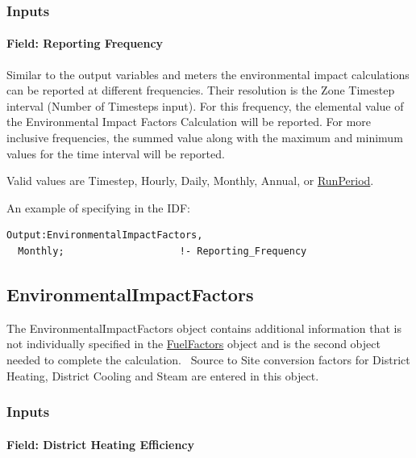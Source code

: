 \subsubsection{Inputs}\label{inputs-9-017}

\paragraph{Field: Reporting Frequency}\label{field-reporting-frequency-2}

Similar to the output variables and meters the environmental impact calculations can be reported at different frequencies. Their resolution is the Zone Timestep interval (Number of Timesteps input). For this frequency, the elemental value of the Environmental Impact Factors Calculation will be reported. For more inclusive frequencies, the summed value along with the maximum and minimum values for the time interval will be reported.

Valid values are Timestep, Hourly, Daily, Monthly, Annual, or \hyperref[runperiod]{RunPeriod}.

An example of specifying in the IDF:

\begin{lstlisting}
Output:EnvironmentalImpactFactors,
  Monthly;                    !- Reporting_Frequency
\end{lstlisting}

\subsection{EnvironmentalImpactFactors}\label{environmentalimpactfactors}

The EnvironmentalImpactFactors object contains additional information that is not individually specified in the \hyperref[fuelfactors]{FuelFactors} object and is the second object needed to complete the calculation.~ Source to Site conversion factors for District Heating, District Cooling and Steam are entered in this object.

\subsubsection{Inputs}\label{inputs-10-017}

\paragraph{Field: District Heating Efficiency}\label{field-district-heating-efficiency}

